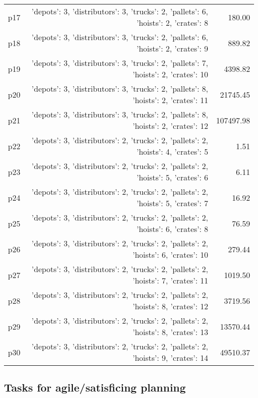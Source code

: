 \documentclass{article}
\begin{document}
\begin{center}
\begin{tabular}{@{}l|r|r@{}}
  p17&{'depots': 3, 'distributors': 3, 'trucks': 2, 'pallets': 6, 'hoists': 2, 'crates': 8}&180.00\\
  p18&{'depots': 3, 'distributors': 3, 'trucks': 2, 'pallets': 6, 'hoists': 2, 'crates': 9}&889.82\\
  p19&{'depots': 3, 'distributors': 3, 'trucks': 2, 'pallets': 7, 'hoists': 2, 'crates': 10}&4398.82\\
  p20&{'depots': 3, 'distributors': 3, 'trucks': 2, 'pallets': 8, 'hoists': 2, 'crates': 11}&21745.45\\
  p21&{'depots': 3, 'distributors': 3, 'trucks': 2, 'pallets': 8, 'hoists': 2, 'crates': 12}&107497.98\\
  p22&{'depots': 3, 'distributors': 2, 'trucks': 2, 'pallets': 2, 'hoists': 4, 'crates': 5}&1.51\\
  p23&{'depots': 3, 'distributors': 2, 'trucks': 2, 'pallets': 2, 'hoists': 5, 'crates': 6}&6.11\\
  p24&{'depots': 3, 'distributors': 2, 'trucks': 2, 'pallets': 2, 'hoists': 5, 'crates': 7}&16.92\\
  p25&{'depots': 3, 'distributors': 2, 'trucks': 2, 'pallets': 2, 'hoists': 6, 'crates': 8}&76.59\\
  p26&{'depots': 3, 'distributors': 2, 'trucks': 2, 'pallets': 2, 'hoists': 6, 'crates': 10}&279.44\\
  p27&{'depots': 3, 'distributors': 2, 'trucks': 2, 'pallets': 2, 'hoists': 7, 'crates': 11}&1019.50\\
  p28&{'depots': 3, 'distributors': 2, 'trucks': 2, 'pallets': 2, 'hoists': 8, 'crates': 12}&3719.56\\
  p29&{'depots': 3, 'distributors': 2, 'trucks': 2, 'pallets': 2, 'hoists': 8, 'crates': 13}&13570.44\\
  p30&{'depots': 3, 'distributors': 2, 'trucks': 2, 'pallets': 2, 'hoists': 9, 'crates': 14}&49510.37
                            \end{tabular}
                            \end{center}
                    

                                \subsection*{Tasks for agile/satisficing planning}
                                
\end{document}
